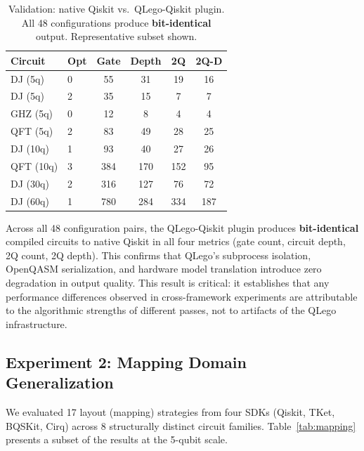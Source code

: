 \documentclass[conference]{IEEEtran}
\begin{document}
\begin{table}[t]
\centering
\caption{Validation: native Qiskit vs.\ QLego-Qiskit plugin. All 48 configurations produce \textbf{bit-identical} output. Representative subset shown.}
\label{tab:validation}
\begin{tabular}{llcccc}
\hline
\textbf{Circuit} & \textbf{Opt} & \textbf{Gate} & \textbf{Depth} & \textbf{2Q} & \textbf{2Q-D} \\
\hline
DJ (5q)   & 0 & 55  & 31  & 19  & 16 \\
DJ (5q)   & 2 & 35  & 15  &  7  &  7 \\
GHZ (5q)  & 0 & 12  &  8  &  4  &  4 \\
QFT (5q)  & 2 & 83  & 49  & 28  & 25 \\
DJ (10q)  & 1 & 93  & 40  & 27  & 26 \\
QFT (10q) & 3 & 384 & 170 & 152 & 95 \\
DJ (30q)  & 2 & 316 & 127 & 76  & 72 \\
DJ (60q)  & 1 & 780 & 284 & 334 & 187 \\
\hline
\end{tabular}
\end{table}

Across all 48 configuration pairs, the QLego-Qiskit plugin produces \textbf{bit-identical} compiled circuits to native Qiskit in all four metrics (gate count, circuit depth, 2Q count, 2Q depth). This confirms that QLego's subprocess isolation, OpenQASM serialization, and hardware model translation introduce zero degradation in output quality. This result is critical: it establishes that any performance differences observed in cross-framework experiments are attributable to the algorithmic strengths of different passes, not to artifacts of the QLego infrastructure.

\subsection{Experiment 2: Mapping Domain Generalization}

We evaluated 17 layout (mapping) strategies from four SDKs (Qiskit, TKet, BQSKit, Cirq) across 8 structurally distinct circuit families. Table~\ref{tab:mapping} presents a subset of the results at the 5-qubit scale.
\end{document}
